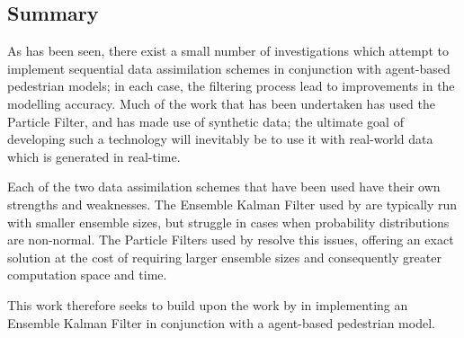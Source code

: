 \subsection{Summary}\label{sub:lit_rev:summary}



As has been seen, there exist a small number of investigations which attempt to
implement sequential data assimilation schemes in conjunction with agent-based
pedestrian models; in each case, the filtering process lead to improvements in
the modelling accuracy.
Much of the work that has been undertaken has used the Particle Filter, and has
made use of synthetic data; the ultimate goal of developing such a technology
will inevitably be to use it with real-world data which is generated in
real-time.

Each of the two data assimilation schemes that have been used have their own
strengths and weaknesses.
The Ensemble Kalman Filter used by \citet{ward2016dynamic} are typically run
with smaller ensemble sizes, but struggle in cases when probability
distributions are non-normal. 
The Particle Filters used by \citet{wang2013data, rai2013behavior,
wang2015data} resolve this issues, offering an exact solution at the cost of
requiring larger ensemble sizes and consequently greater computation space and
time.

This work therefore seeks to build upon the work by \citet{ward2016dynamic} in
implementing an Ensemble Kalman Filter in conjunction with a agent-based
pedestrian model.

